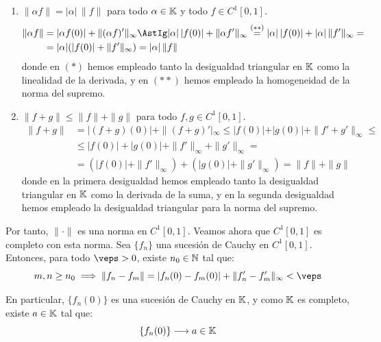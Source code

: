 \begin{ejercicio}
\begin{enumerate}
        Si $f = 0$, entonces $f(0) = 0$ y $f' = 0$, luego $\|f\| = 0$. Supongamos ahora que $\|f\| = 0$. Entonces, $|f(0)| = 0$ y $\|f'\|_\infty = 0$. Por ser $|\cdot|$ y $\|\cdot\|_\infty$ normas, se deduce que $f(0) = 0$ y $f' = 0$. De $f' = 0$ se deduce que $f$ es constante, y como $f(0) = 0$, se concluye que $f = 0$. Por tanto, $\|f\| = 0 \iff f = 0$.
        \item $\|\alpha f\| = |\alpha| \, \|f\|$ para todo $\alpha \in \mathbb{K}$ y todo $f \in C^1\left[0, 1\right]$.
        \begin{align*}
            \|\alpha f\| &= |\alpha f(0)| + \|(\alpha f)'\|_\infty \AstIg |\alpha| \, |f(0)| + \| \alpha f'\|_\infty \stackrel{(\ast\ast)}{=} |\alpha| \, |f(0)| + |\alpha| \, \|f'\|_\infty =\\&= |\alpha| (|f(0)| + \|f'\|_\infty) = |\alpha| \, \|f\|
        \end{align*}
        donde en $(\ast)$ hemos empleado tanto la desigualdad triangular en $\mathbb{K}$ como la linealidad de la derivada, y en $(\ast\ast)$ hemos empleado la homogeneidad de la norma del supremo.
        \item $\|f + g\| \leq \|f\| + \|g\|$ para todo $f, g \in C^1\left[0, 1\right]$.
        \begin{align*}
            \|f + g\| &= |(f + g)(0)| + \|(f + g)'|_\infty \leq |f(0)| + |g(0)| + \|f' + g'\|_\infty \leq\\&\leq |f(0)| + |g(0)| + \|f'\|_\infty + \|g'\|_\infty =\\&= (|f(0)| + \|f'\|_\infty) + (|g(0)| + \|g'\|_\infty) = \|f\| + \|g\|
        \end{align*}
        donde en la primera desigualdad hemos empleado tanto la desigualdad triangular en $\mathbb{K}$ como la derivada de la suma, y en la segunda desigualdad hemos empleado la desigualdad triangular para la norma del supremo.
    \end{enumerate}

    Por tanto, $\|\cdot\|$ es una norma en $C^1\left[0, 1\right]$. Veamos ahora que $C^1\left[0, 1\right]$ es completo con esta norma. Sea $\{f_n\}$ una sucesión de Cauchy en $C^1\left[0, 1\right]$. Entonces, para todo $\veps > 0$, existe $n_0 \in \mathbb{N}$ tal que:
    \begin{equation*}
        m, n \geq n_0 \implies \|f_n - f_m\| = |f_n(0) - f_m(0)| + \|f_n' - f_m'\|_\infty < \veps
    \end{equation*}

    En particular, $\{f_n(0)\}$ es una sucesión de Cauchy en $\mathbb{K}$, y como $\mathbb{K}$ es completo, existe $a \in \mathbb{K}$ tal que:
    \begin{equation*}
        \{f_n(0)\} \longrightarrow a \in \mathbb{K}
    \end{equation*}


\end{ejercicio}
